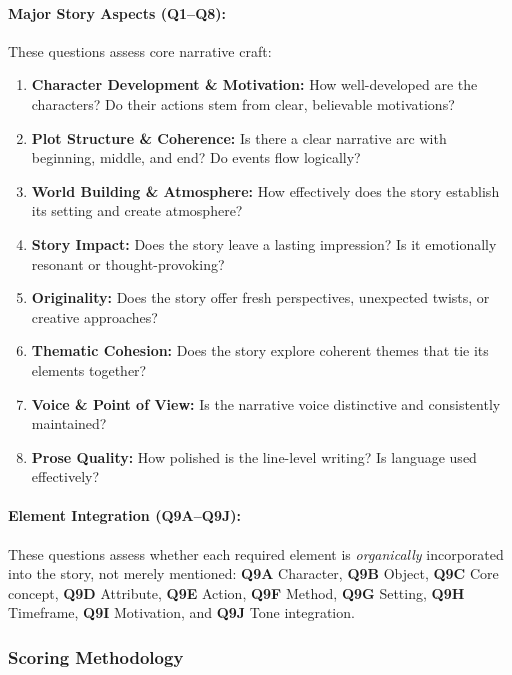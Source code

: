 \documentclass{article}
\theoremstyle{plain}
\theoremstyle{definition}
\theoremstyle{remark}
\begin{document}
\paragraph{Major Story Aspects (Q1--Q8):} These questions assess core narrative craft:
\begin{enumerate}
    \item[\textbf{Q1.}] \textbf{Character Development \& Motivation:} How well-developed are the characters? Do their actions stem from clear, believable motivations?
    \item[\textbf{Q2.}] \textbf{Plot Structure \& Coherence:} Is there a clear narrative arc with beginning, middle, and end? Do events flow logically?
    \item[\textbf{Q3.}] \textbf{World Building \& Atmosphere:} How effectively does the story establish its setting and create atmosphere?
    \item[\textbf{Q4.}] \textbf{Story Impact:} Does the story leave a lasting impression? Is it emotionally resonant or thought-provoking?
    \item[\textbf{Q5.}] \textbf{Originality:} Does the story offer fresh perspectives, unexpected twists, or creative approaches?
    \item[\textbf{Q6.}] \textbf{Thematic Cohesion:} Does the story explore coherent themes that tie its elements together?
    \item[\textbf{Q7.}] \textbf{Voice \& Point of View:} Is the narrative voice distinctive and consistently maintained?
    \item[\textbf{Q8.}] \textbf{Prose Quality:} How polished is the line-level writing? Is language used effectively?
\end{enumerate}

\paragraph{Element Integration (Q9A--Q9J):} These questions assess whether each required element is \textit{organically} incorporated into the story, not merely mentioned:
\textbf{Q9A} Character, \textbf{Q9B} Object, \textbf{Q9C} Core concept, \textbf{Q9D} Attribute, \textbf{Q9E} Action, \textbf{Q9F} Method, \textbf{Q9G} Setting, \textbf{Q9H} Timeframe, \textbf{Q9I} Motivation, and \textbf{Q9J} Tone integration.

\subsubsection{Scoring Methodology}
\end{document}

